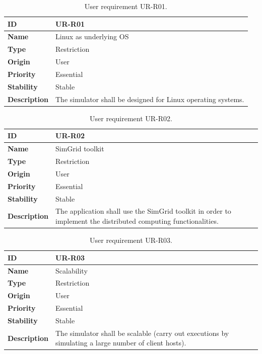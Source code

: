 \begin{center}
\begin{table}[htbp]
\centering
\begin{tabular}{@{}p{2.5cm} p{9cm}@{}} 
\toprule
\textbf{ID} 				& UR-R01\\
\midrule
\textbf{Name} 			& Linux as underlying OS \\
\midrule
\textbf{Type} 			& Restriction \\
\midrule
\textbf{Origin} 			& User \\
\midrule
\textbf{Priority}		& Essential \\
\midrule
\textbf{Stability} 		& Stable \\
\midrule
\textbf{Description} 	& The simulator shall be designed for Linux operating systems. \\
\bottomrule
\end{tabular}
\caption{User requirement UR-R01.}
\label{tab:urr01}
\end{table}
\end{center}

\begin{center}
\begin{table}[htbp]
\centering
\begin{tabular}{@{}p{2.5cm} p{9cm}@{}} 
\toprule
\textbf{ID} 				& UR-R02\\
\midrule
\textbf{Name} 			& SimGrid toolkit \\
\midrule
\textbf{Type} 			& Restriction \\
\midrule
\textbf{Origin} 			& User \\
\midrule
\textbf{Priority}		& Essential \\
\midrule
\textbf{Stability} 		& Stable \\
\midrule
\textbf{Description} 	& The application shall use the SimGrid toolkit in order to implement the distributed computing functionalities. \\
\bottomrule
\end{tabular}
\caption{User requirement UR-R02.}
\label{tab:urr02}
\end{table}
\end{center}

\begin{center}
\begin{table}[htbp]
\centering
\begin{tabular}{@{}p{2.5cm} p{9cm}@{}} 
\toprule
\textbf{ID} 				& UR-R03\\
\midrule
\textbf{Name} 			& Scalability \\
\midrule
\textbf{Type} 			& Restriction \\
\midrule
\textbf{Origin} 			& User \\
\midrule
\textbf{Priority}		& Essential \\
\midrule
\textbf{Stability} 		& Stable \\
\midrule
\textbf{Description} 	& The simulator shall be scalable (carry out executions by simulating a large number of client hosts). \\
\bottomrule
\end{tabular}
\caption{User requirement UR-R03.}
\label{tab:urr03}
\end{table}
\end{center}

